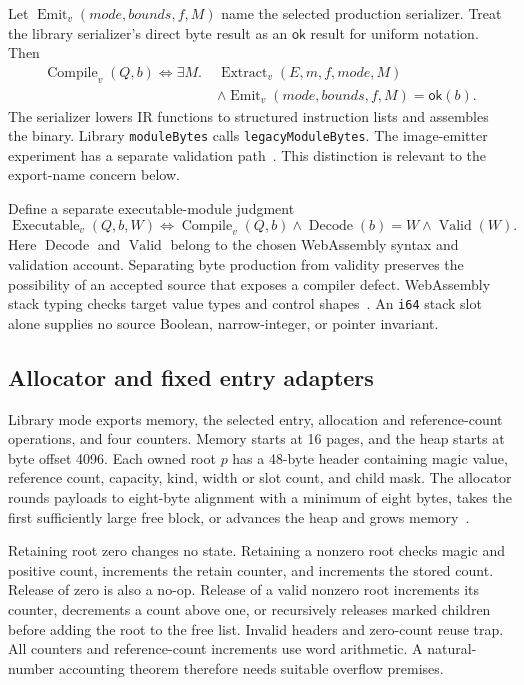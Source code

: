 \documentclass[11pt]{article}
\newcommand{\code}[1]{\texttt{#1}}
\newcommand{\ok}{\mathsf{ok}}
\begin{document}
Let $\operatorname{Emit}_v(\mathit{mode},\mathit{bounds},f,M)$ name the selected production serializer.  Treat the library serializer's direct byte result as an $\ok$ result for uniform notation.  Then
\begin{align*}
\operatorname{Compile}_v(Q,b)\iff\exists M.\;&
\operatorname{Extract}_v(E,m,f,\mathit{mode},M)\\
&\land\operatorname{Emit}_v(\mathit{mode},\mathit{bounds},f,M)=\ok(b).
\end{align*}
The serializer lowers IR functions to structured instruction lists and assembles the binary.  Library \code{moduleBytes} calls \code{legacyModuleBytes}.  The image-emitter experiment has a separate validation path~\cite{binary}.  This distinction is relevant to the export-name concern below.

Define a separate executable-module judgment
\[
\operatorname{Executable}_v(Q,b,W)
\iff\operatorname{Compile}_v(Q,b)\land\operatorname{Decode}(b)=W
       \land\operatorname{Valid}(W).
\]
Here $\operatorname{Decode}$ and $\operatorname{Valid}$ belong to the chosen WebAssembly syntax and validation account.  Separating byte production from validity preserves the possibility of an accepted source that exposes a compiler defect.  WebAssembly stack typing checks target value types and control shapes~\cite{wasm}.  An \code{i64} stack slot alone supplies no source Boolean, narrow-integer, or pointer invariant.

\subsection{Allocator and fixed entry adapters}
\label{sec:allocator}

Library mode exports memory, the selected entry, allocation and reference-count operations, and four counters.  Memory starts at 16 pages, and the heap starts at byte offset 4096.  Each owned root $p$ has a 48-byte header containing magic value, reference count, capacity, kind, width or slot count, and child mask.  The allocator rounds payloads to eight-byte alignment with a minimum of eight bytes, takes the first sufficiently large free block, or advances the heap and grows memory~\cite{binary}.

Retaining root zero changes no state.  Retaining a nonzero root checks magic and positive count, increments the retain counter, and increments the stored count.  Release of zero is also a no-op.  Release of a valid nonzero root increments its counter, decrements a count above one, or recursively releases marked children before adding the root to the free list.  Invalid headers and zero-count reuse trap.  All counters and reference-count increments use word arithmetic.  A natural-number accounting theorem therefore needs suitable overflow premises.
\end{document}
